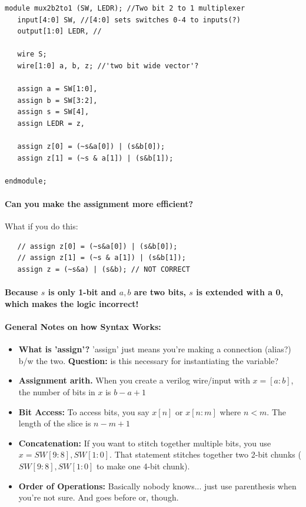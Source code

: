 \documentclass[a4paper,12pt]{report}
\begin{document}
\begin{lstlisting}
module mux2b2to1 (SW, LEDR); //Two bit 2 to 1 multiplexer  
   input[4:0] SW, //[4:0] sets switches 0-4 to inputs(?)
   output[1:0] LEDR, //

   wire S;
   wire[1:0] a, b, z; //'two bit wide vector'?

   assign a = SW[1:0],
   assign b = SW[3:2],
   assign s = SW[4],
   assign LEDR = z,

   assign z[0] = (~s&a[0]) | (s&b[0]);
   assign z[1] = (~s & a[1]) | (s&b[1]);

endmodule;
\end{lstlisting}

\paragraph{Can you make the assignment more efficient?}
What if you do this:
\begin{lstlisting}
   // assign z[0] = (~s&a[0]) | (s&b[0]);
   // assign z[1] = (~s & a[1]) | (s&b[1]);
   assign z = (~s&a) | (s&b); // NOT CORRECT
\end{lstlisting}

\paragraph{Because $s$ is only 1-bit and $a, b$ are two bits, $s$ is extended with a \textbf{0}, 
which makes the logic incorrect!}

\paragraph{General Notes on how Syntax Works:}
\begin{itemize}
\item \textbf{What is 'assign'? } 'assign' just means you're making a connection (alias?) b/w the
two. \textbf{Question: } is this necessary for instantiating the variable?
\item \textbf{Assignment arith.} When you create a verilog wire/input with $x = [a:b]$, the number of bits in 
$x$ is $b-a + 1$
\item \textbf{Bit Access: } To access bits, you say $x[n]$ or $x[n:m]$ where $n < m$. The length of the slice
is $n-m +1$
\item \textbf{Concatenation: } If you want to stitch together multiple bits, you use $x = {SW[9:8], SW[1:0]}$. That
statement stitches together two 2-bit chunks ($SW[9:8], SW[1:0]$ to make one 4-bit chunk).
\item \textbf{Order of Operations: } Basically nobody knows... just use parenthesis when you're
not sure. And goes before or, though.
\end{itemize}
\end{document}
